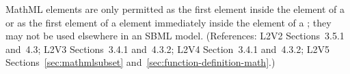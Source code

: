 MathML  elements are only permitted as the first element
inside the  element of a \FunctionDefinition or as the
first element of a  element immediately inside the
 element of a \FunctionDefinition; they may not be used
elsewhere in an SBML model.  (References: L2V2 Sections~3.5.1 and~4.3;
L2V3 Sections~3.4.1 and~4.3.2; L2V4 Section~3.4.1 and~4.3.2; L2V5 Sections~\ref{sec:mathmlsubset}
and~\ref{sec:function-definition-math}.)

